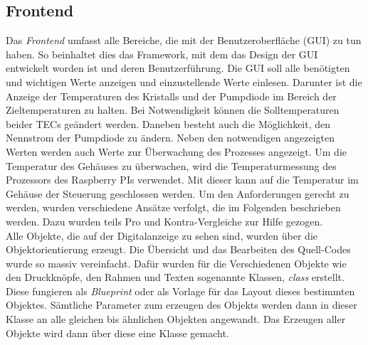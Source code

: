 \subsection{Frontend}
Das \textit{Frontend} umfasst alle Bereiche, die mit der Benutzeroberfläche (GUI) zu tun haben. So beinhaltet dies das Framework, mit dem das Design der GUI entwickelt worden ist und deren Benutzerführung. 
Die GUI soll alle benötigten und wichtigen Werte anzeigen und einzustellende Werte einlesen. Darunter ist die Anzeige der Temperaturen des Kristalls und der Pumpdiode im Bereich der Zieltemperaturen zu halten. Bei Notwendigkeit können die Solltemperaturen beider TECs geändert werden. Daneben besteht auch die Möglichkeit, den Nennstrom der Pumpdiode zu ändern. Neben den notwendigen angezeigten Werten werden auch Werte zur Überwachung des Prozesses angezeigt. Um die Temperatur des Gehäuses zu überwachen, wird die Temperaturmessung des Prozessors des Raspberry PIs verwendet. Mit dieser kann auf die Temperatur im Gehäuse der Steuerung geschlossen werden. Um den Anforderungen gerecht zu werden, wurden verschiedene Ansätze verfolgt, die im Folgenden beschrieben werden. Dazu wurden teils Pro und Kontra-Vergleiche zur Hilfe gezogen.\\

Alle Objekte, die auf der Digitalanzeige zu sehen sind, wurden über die Objektorientierung erzeugt. Die Übersicht und das Bearbeiten des Quell-Codes wurde so massiv vereinfacht. Dafür wurden für die Verschiedenen Objekte wie den Druckknöpfe, den Rahmen und Texten sogenannte Klassen, \textit{class} erstellt. Diese fungieren als \textit{Blueprint} oder als Vorlage für das Layout dieses bestimmten Objektes. Sämtliche Parameter zum erzeugen des Objekts werden dann in dieser Klasse an alle gleichen bis ähnlichen Objekten angewandt. Das Erzeugen aller Objekte wird dann über diese eine Klasse gemacht.

